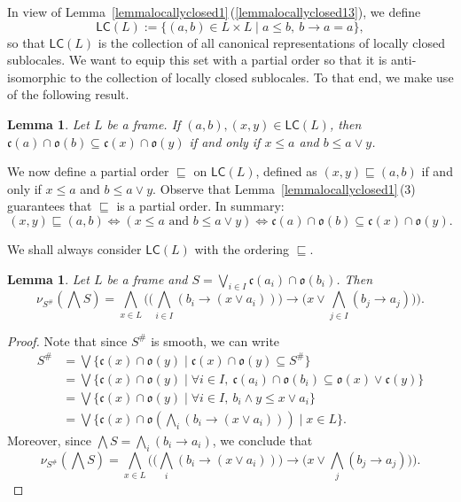 \documentclass[11pt,a4paper,reqno]{amsart}
\newcommand{\tbigwedge}{\mathop{\textstyle \bigwedge }}%
\newcommand{\tbigvee}{\mathop{\textstyle \bigvee }}%
\newcommand{\cat}[1]{\ensuremath{\mathsf{#1}}} %
\def\cl{\mathfrak{c}}
\def\op{\mathfrak{o}}
\newtheorem{lemma}[theorem]{Lemma}
\theoremstyle{definition}
\theoremstyle{remark}
\newcommand{\mf}{\mathsf}
\begin{document}
{In view of Lemma~\ref{lemmalocallyclosed1}\,(\ref{lemmalocallyclosed13}), we define
$$\cat{LC}(L):=\{(a,b)\in L\times L\mid a\leq b,\ b\to a=a\},$$
so that $\mf{LC}(L)$ is the collection of all canonical representations of locally closed sublocales. We want to equip this set with a partial order so that it is anti-isomorphic to the collection of locally closed sublocales. To that end, we make use of the following result.

\begin{lemma}\label{lemmaordering111}Let $L$ be a frame.
If $(a,b),(x,y)\in	\cat{LC}(L)$, then $\cl(a)\cap\op(b)\subseteq \cl(x)\cap\op(y)$ if and only if $x \leq a$ and $b\leq a\vee y$.
\end{lemma}

We now define a partial order $\sqsubseteq$ on $\mf{LC}(L)$, defined as $(x,y)\sqsubseteq(a,b)$ if and only if $x \leq a$ and $b\leq a\vee y$. Observe that Lemma~\ref{lemmalocallyclosed1}\,(3) guarantees that $\sqsubseteq$ is a partial order. In summary:
$$(x,y)\sqsubseteq (a,b) \iff (x\leq a \text{ and } b\leq a\vee y) \iff \cl(a)\cap \op(b)\subseteq \cl(x)\cap \op(y).$$

We shall always consider $\cat{LC}(L)$ with the ordering $\sqsubseteq$.


\begin{lemma}\label{l: bwe S for a smooth sublocale S}
Let $L$ be a frame and $S=\tbigvee_{i\in I}\cl(a_i)\cap \op(b_i)$. Then
$$\nu_{S^\#}(\tbigwedge S) = \tbigwedge_{x\in L} \biggl(  \big(\tbigwedge _{i\in I} (b_i\to (x\vee a_i)) \big) \to \big( x\vee  \tbigwedge_{j\in I}(b_j\to a_j)\bigr) \biggr).$$
\end{lemma}

\begin{proof}
Note that since $S^{\#}$ is smooth, we can write \begin{align*} S^{\#}&= \tbigvee\{ \cl(x)\cap\op(y)\mid \cl(x)\cap\op(y)\subseteq S^{\#} \}
\\& = \tbigvee\{ \cl(x)\cap\op(y)\mid \forall i\in I,\ \cl(a_i)\cap\op(b_i)\subseteq \op(x)\vee \cl(y) \}\\& = \tbigvee\{ \cl(x)\cap\op(y)\mid \forall i\in I,\ b_i\wedge y \leq x\vee a_i \}
\\&  =\tbigvee\{ \cl(x)\cap\op(\tbigwedge _i (b_i\to (x\vee a_i)))\mid x\in L\}.
\end{align*}
Moreover, since $\tbigwedge S= \tbigwedge_i (b_i\to a_i)$, we conclude that
$$\nu_{S^{\#}} (\tbigwedge S)=\tbigwedge_{x\in L} \biggl(  \big(\tbigwedge _i (b_i\to (x\vee a_i)) \big) \to \big( x\vee  \tbigwedge_j(b_j\to a_j)\bigr) \biggr).$$
\end{proof}

}
\end{document}

